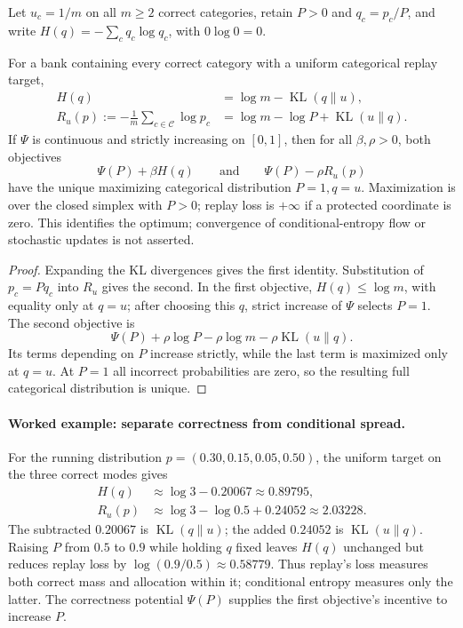 Let $u_c=1/m$ on all $m\ge2$ correct categories, retain $P>0$ and
$q_c=p_c/P$, and write $H(q)=-\sum_cq_c\log q_c$, with $0\log0=0$.

\begin{lemma}
\label{ext:lem-entropy-objectives}
For a bank containing every correct category with a uniform categorical
replay target,
\begin{align}
 H(q)&=\log m-\operatorname{KL}(q\|u),
 \label{ext:eq-conditional-entropy-kl}\\
 R_u(p):=-\frac1m\sum_{c\in\mathcal C}\log p_c
 &=\log m-\log P+\operatorname{KL}(u\|q).
 \label{ext:eq-uniform-replay-kl}
\end{align}
If $\Psi$ is continuous and strictly increasing on $[0,1]$, then for all
$\beta,\rho>0$, both objectives
\[
 \Psi(P)+\beta H(q)
 \qquad\text{and}\qquad
 \Psi(P)-\rho R_u(p)
\]
have the unique maximizing categorical distribution $P=1,q=u$. Maximization
is over the closed simplex with $P>0$; replay loss is $+\infty$ if a protected
coordinate is zero. This identifies the optimum; convergence of conditional-entropy
flow or stochastic updates is not asserted.
\end{lemma}

\begin{proof}
Expanding the KL divergences gives the first identity. Substitution of
$p_c=Pq_c$ into $R_u$ gives the second. In the first objective,
$H(q)\le\log m$, with equality only at $q=u$; after choosing this $q$,
strict increase of $\Psi$ selects $P=1$. The second objective is
\[
 \Psi(P)+\rho\log P-\rho\log m
       -\rho\operatorname{KL}(u\|q).
\]
Its terms depending on $P$ increase strictly, while the last term is
maximized only at $q=u$. At $P=1$ all incorrect probabilities are zero,
so the resulting full categorical distribution is unique.
\end{proof}

\paragraph{Worked example: separate correctness from conditional spread.}
For the running distribution $p=(0.30,0.15,0.05,0.50)$, the uniform target
on the three correct modes gives
\[
 \begin{aligned}
 H(q)&\approx\log3-0.20067\approx0.89795,\\
 R_u(p)&\approx\log3-\log0.5+0.24052\approx2.03228.
 \end{aligned}
\]
The subtracted $0.20067$ is $\operatorname{KL}(q\|u)$; the added $0.24052$
is $\operatorname{KL}(u\|q)$. Raising $P$ from $0.5$ to $0.9$ while holding
$q$ fixed leaves $H(q)$ unchanged but reduces replay loss by
$\log(0.9/0.5)\approx0.58779$. Thus replay's loss measures both correct mass
and allocation within it; conditional entropy measures only the latter.
The correctness potential $\Psi(P)$ supplies the first objective's incentive
to increase $P$.

